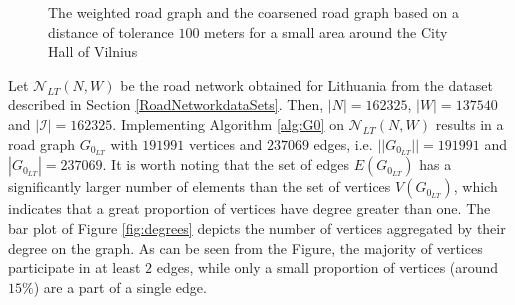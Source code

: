 \documentclass[12pt]{article}
\theoremstyle{definition}
\begin{document}
\begin{figure}[!ht]
    \centering
    \qquad
    \caption{The weighted road graph and the coarsened road graph based on a distance of tolerance $100$ meters for a small area around the City Hall of Vilnius}%
    \label{fig:WeightedAndCoarsened}
\end{figure}

Let $\mathcal{N}_{LT}(N,W)$ be the road network obtained for Lithuania from the dataset described in Section \ref{RoadNetworkdataSets}. Then, $|N|=162325$, $|W|=137540$ and $|\mathcal{I}|=162325$. Implementing Algorithm \ref{alg:G0} on $\mathcal{N}_{LT}(N,W)$ results in a road graph $G_{0_{LT}}$ with $191991$ vertices and $237069$ edges, i.e. $||G_{0_{LT}}||=191991$ and $|G_{0_{LT}}|=237069$. It is worth noting that the set of edges $E(G_{0_{LT}})$ has a significantly larger number of elements than the set of vertices $V(G_{0_{LT}})$, which indicates that a great proportion of vertices have degree greater than one. The bar plot of Figure \ref{fig:degrees} depicts the number of vertices aggregated by their degree on the graph. As can be seen from the Figure, the majority of vertices participate in at least $2$ edges, while only a small proportion of vertices (around $15\%$) are a part of a single edge. 
\end{document}
